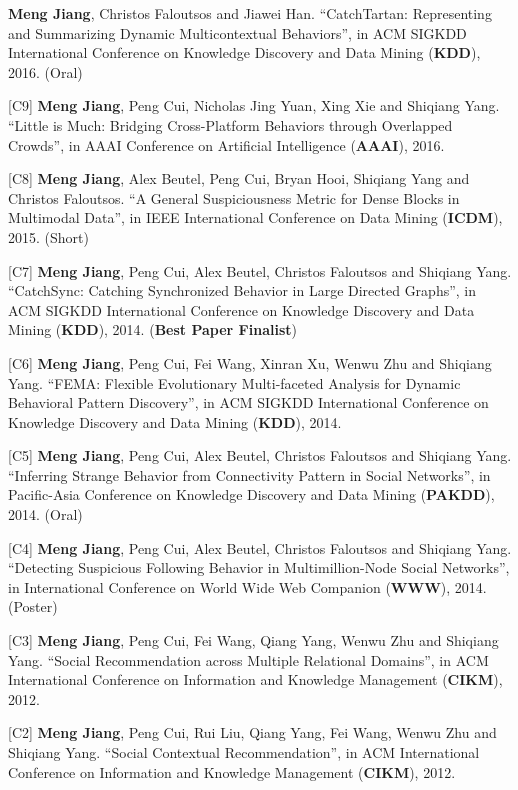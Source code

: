 \documentclass[margin, 9pt]{res}
\begin{document}
\begin{resume}
[C10] \textbf{Meng Jiang}, Christos Faloutsos and Jiawei Han. ``CatchTartan: Representing and Summarizing Dynamic Multicontextual Behaviors'', in ACM SIGKDD International Conference on Knowledge Discovery and Data Mining (\textbf{KDD}), 2016. (Oral)

[C9] \textbf{Meng Jiang}, Peng Cui, Nicholas Jing Yuan, Xing Xie and Shiqiang Yang. ``Little is Much: Bridging Cross-Platform Behaviors through Overlapped Crowds'', in AAAI Conference on Artificial Intelligence (\textbf{AAAI}), 2016.

[C8] \textbf{Meng Jiang}, Alex Beutel, Peng Cui, Bryan Hooi, Shiqiang Yang and Christos Faloutsos. ``A General Suspiciousness Metric for Dense Blocks in Multimodal Data'', in IEEE International Conference on Data Mining (\textbf{ICDM}), 2015. (Short)

[C7] \textbf{Meng Jiang}, Peng Cui, Alex Beutel, Christos Faloutsos and Shiqiang Yang. ``CatchSync: Catching Synchronized Behavior in Large Directed Graphs'', in ACM SIGKDD International Conference on Knowledge Discovery and Data Mining (\textbf{KDD}), 2014. (\textbf{Best Paper Finalist})

[C6] \textbf{Meng Jiang}, Peng Cui, Fei Wang, Xinran Xu, Wenwu Zhu and Shiqiang Yang. ``FEMA: Flexible Evolutionary Multi-faceted Analysis for Dynamic Behavioral Pattern Discovery'', in ACM SIGKDD International Conference on Knowledge Discovery and Data Mining (\textbf{KDD}), 2014.

[C5] \textbf{Meng Jiang}, Peng Cui, Alex Beutel, Christos Faloutsos and Shiqiang Yang. ``Inferring Strange Behavior from Connectivity Pattern in Social Networks'', in Pacific-Asia Conference on Knowledge Discovery and Data Mining (\textbf{PAKDD}), 2014. (Oral)

[C4] \textbf{Meng Jiang}, Peng Cui, Alex Beutel, Christos Faloutsos and Shiqiang Yang. ``Detecting Suspicious Following Behavior in Multimillion-Node Social Networks'', in International Conference on World Wide Web Companion (\textbf{WWW}), 2014. (Poster)

[C3] \textbf{Meng Jiang}, Peng Cui, Fei Wang, Qiang Yang, Wenwu Zhu and Shiqiang Yang. ``Social Recommendation across Multiple Relational Domains'', in ACM International Conference on Information and Knowledge Management (\textbf{CIKM}), 2012.

[C2] \textbf{Meng Jiang}, Peng Cui, Rui Liu, Qiang Yang, Fei Wang, Wenwu Zhu and Shiqiang Yang. ``Social Contextual Recommendation'', in ACM International Conference on Information and Knowledge Management (\textbf{CIKM}), 2012.


\end{resume}
\end{document}
